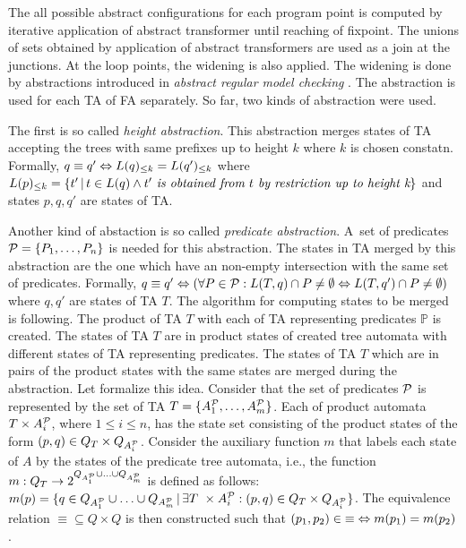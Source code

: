 \documentclass[a4paper, 12pt]{article}
\begin{document}
The all possible abstract configurations for each program point is computed by
iterative application of abstract transformer until reaching of fixpoint.
The unions of sets obtained by application of abstract transformers are used
as a join at the junctions.
At the loop points, the widening is also applied.
The widening is done by abstractions introduced in \emph{abstract regular model checking} \cite{artmc}.
The abstraction is used for each TA of FA separately.
So far, two kinds of abstraction were used.

The first is so called \emph{height abstraction}.
This abstraction merges states of TA accepting the trees with same prefixes
up to height $k$ where $k$ is chosen constatn.
Formally, $q \equiv q' \Leftrightarrow L(q)_{\leq k} = L(q')_{\leq k}$
where $L(p)_{\leq k} = \{t'\,|\, t \in L(q) \wedge t' \emph{ is obtained from } t \emph{ by restriction up to height k}\}$
and states $p,q,q'$ are states of TA.

Another kind of abstaction is so called \emph{predicate abstraction}.
A~set of predicates $\mathcal{P}=\{P_1, \ldots, P_n\}$ is needed for this abstraction.
The states in TA merged by this abstraction are the one which have an non-empty
intersection with the same set of predicates.
Formally, $q \equiv q' \Leftrightarrow
(\forall P \in \mathcal{P}: L(T,q) \cap P \neq \emptyset
\Leftrightarrow L(T,q') \cap P \neq \emptyset)$
where $q,q'$ are states of TA $T$.
The algorithm for computing states to be merged is following.
The product of TA $T$ with each of TA representing predicates $\mathbb{P}$ is created.
The states of TA $T$ are in product states of created tree automata with different
states of TA representing predicates.
The states of TA $T$ which are in pairs of the product states with the same states are merged during
the abstraction.
Let formalize this idea.
Consider that the set of predicates $\mathcal{P}$ is represented by the set of TA
$T=\{A^\mathcal{P}_{1}, \ldots, A^\mathcal{P}_{m}\}$.
Each of product automata $T \times A^\mathcal{P}_{i}$, where $1 \leq i \leq n$, has the state set
consisting of the product states of the form $(p,q) \in Q_T \times Q_{A^\mathcal{P}_{i}}$.
Consider the auxiliary function $m$ that labels
each state of $A$ by the states of the predicate tree automata,
i.e., the function $m: Q_T \rightarrow 2^{Q_{A^\mathcal{P}_{1}} \cup \ldots
\cup Q_{A^\mathcal{P}_{m}}}$ is defined as follows: $m(p) = \{q \in Q_{A^\mathcal{P}_{1}} \cup \ldots \cup Q_{A^\mathcal{P}_{m}}\,|\,
\exists T~\times A^\mathcal{P}_{i}: (p,q) \in Q_{T} \times Q_{A^\mathcal{P}_{i}}\}$.
The equivalence relation ${\equiv} \subseteq {Q \times Q}$ is then constructed
such that ${(p_1,p_2)} \in {\equiv} \Leftrightarrow m(p_1) = m(p_2)$.
\end{document}
